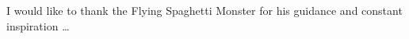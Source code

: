 
I would like to thank the Flying Spaghetti Monster for his guidance and
constant inspiration \ldots
